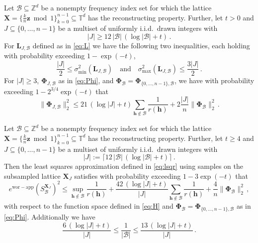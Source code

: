 \documentclass[10pt,a4paper]{amsart}
\newcommand{\ewc}{e^{\mathrm{wor-app}}}
\newcommand{\modone}{\bmod{}1}
\begin{document}
\begin{lemma}\label{constructions} Let $\mathcal B\subseteq\mathds Z^d$ be a nonempty frequency index set for which the lattice $\bm X = \{\frac kn\bm z\modone\}_{k=0}^{n-1} \subseteq\mathds T^d$ has the reconstructing property.
    Further, let $t>0$ and $J\subseteq\{0, \dots, n-1\}$ be a multiset of uniformly i.i.d.\ drawn integers with
    \begin{equation}\label{eq:12}
        |J| \ge 12 \, |\mathcal B| \, (\log|\mathcal B| + t) \,.
    \end{equation}
    For $\bm L_{J,\mathcal B}$ defined as in \eqref{eq:L} we have the following two inequalities, each holding with probability exceeding $1-\exp(-t)$,
    \begin{equation}\label{eq:sepultura}
        \frac{|J|}{2} \le \sigma_{\min}^2(\bm L_{J,\mathcal B})
        \quad\text{and}\quad
        \sigma_{\max}^2(\bm L_{J,\mathcal B}) \le \frac{3|J|}{2} \,.
    \end{equation}
    For $|J|\ge 3$, $\bm\Phi_{J,\mathcal B}$ as in \eqref{eq:Phi}, and $\bm\Phi_{\mathcal B} = \bm\Phi_{\{0,\dots,n-1\},\mathcal B}$, we have with probability exceeding $1-2^{3/4}\exp(-t)$ that
    \begin{equation}\label{eq:watain}
        \|\bm\Phi_{J,\mathcal B}\|_{2}^2
        \le 21 \, (\log|J|+t) \sum_{\bm h\notin\mathcal B} \frac{1}{r(\bm h)} + 2\frac{|J|}{n} \|\bm\Phi_{\mathcal B}\|_{2}^2 \,.
    \end{equation}
\end{lemma} 

\begin{theorem}\label{withPhi} Let $\mathcal B\subseteq\mathds Z^d$ be a nonempty frequency index set for which the lattice $\bm X = \{\frac kn\bm z\modone\}_{k=0}^{n-1} \subseteq\mathds T^d$ has the reconstructing property.
    Further, let $t\ge4$ and $J\subseteq\{0, \dots, n-1\}$ be a multiset of uniformly i.i.d.\ drawn integers with
    \begin{equation*}
|J| := \lceil 12 \, |\mathcal B| \, (\log|\mathcal B| + t)\rceil\,.
    \end{equation*}
    Then the least squares approximation defined in \eqref{eq:lsqr} using samples on the subsampled lattice $\bm X_J$ satisfies with probability exceeding $1-3\exp(-t)$ that
    \begin{equation*}
        \ewc(S_{\mathcal B}^{\bm X_J})^2
        \le \sup_{\bm h\notin\mathcal B} \frac{1}{r(\bm h)}
        + 
        \frac{42\,(\log|J|+t)}{|J|}
\sum_{\bm h\notin\mathcal B} \frac{1}{r(\bm h)} + \frac{4}{n} \|
        \bm\Phi_{\mathcal B}\|_{2}^2 \,,
    \end{equation*}
    with respect to the function space defined in \eqref{eq:H} and $\bm\Phi_{\mathcal B} = \bm\Phi_{\{0,\dots,n-1\},\mathcal B}$ as in \eqref{eq:Phi}. Additionally we have
    \begin{equation}\label{eq:JB}
         \frac{6\,(\log|J|+t)}{|J|} 
         \le \frac{1}{|\mathcal B|} 
         \le \frac{13\,(\log|J|+t)}{|J|} \,.
    \end{equation}
\end{theorem} 
\end{document}
